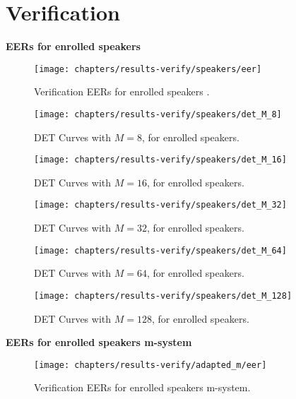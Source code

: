 \chapter{Verification}
\label{apx:results-verify}

\noindent \textbf{EERs for enrolled speakers}



\begin{figure}[ht]
	\centering
	\texttt{[image: chapters/results-verify/speakers/eer]}
	\caption{Verification EERs for enrolled speakers .}
	\label{fig:results-verify}
\end{figure}

\begin{figure}[ht]
	\centering
	\texttt{[image: chapters/results-verify/speakers/det\_M\_8]}
	\caption{DET Curves with $M = 8$, for enrolled speakers.}
	\label{fig:results-verify-M_8}
\end{figure}

\begin{figure}[ht]
	\centering
	\texttt{[image: chapters/results-verify/speakers/det\_M\_16]}
	\caption{DET Curves with $M = 16$, for enrolled speakers.}
	\label{fig:results-verify-M_16}
\end{figure}

\begin{figure}[ht]
	\centering
	\texttt{[image: chapters/results-verify/speakers/det\_M\_32]}
	\caption{DET Curves with $M = 32$, for enrolled speakers.}
	\label{fig:results-verify-M_32}
\end{figure}

\begin{figure}[ht]
	\centering
	\texttt{[image: chapters/results-verify/speakers/det\_M\_64]}
	\caption{DET Curves with $M = 64$, for enrolled speakers.}
	\label{fig:results-verify-M_64}
\end{figure}

\clearpage
\begin{figure}[ht]
	\centering
	\texttt{[image: chapters/results-verify/speakers/det\_M\_128]}
	\caption{DET Curves with $M = 128$, for enrolled speakers.}
	\label{fig:results-verify-M_128}
\end{figure}

\newpage
\noindent \textbf{EERs for enrolled speakers m-system}



\begin{figure}[ht]
	\centering
	\texttt{[image: chapters/results-verify/adapted\_m/eer]}
	\caption{Verification EERs for enrolled speakers  m-system.}
	\label{fig:results-verify-adapted_m}
\end{figure}

